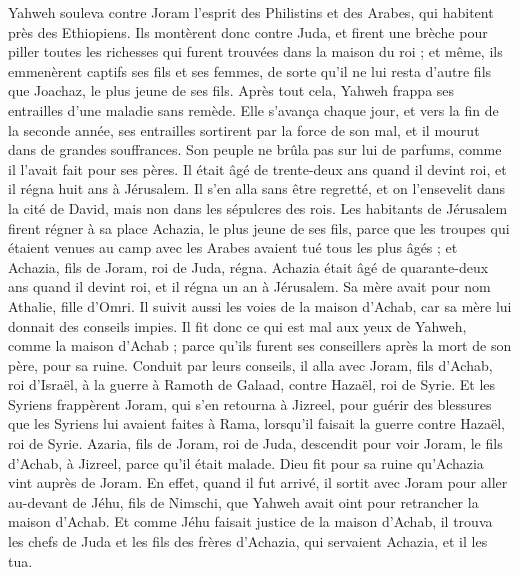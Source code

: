 \begin{multicols}{2}
Yahweh souleva contre Joram l'esprit des Philistins et des Arabes, qui habitent près des Ethiopiens.
Ils montèrent donc contre Juda, et firent une brèche pour piller toutes les richesses qui furent trouvées dans la maison du roi ; et même, ils emmenèrent captifs ses fils et ses femmes, de sorte qu'il ne lui resta d'autre fils que Joachaz, le plus jeune de ses fils.
Après tout cela, Yahweh frappa ses entrailles d'une maladie sans remède.
Elle s'avança chaque jour, et vers la fin de la seconde année, ses entrailles sortirent par la force de son mal, et il mourut dans de grandes souffrances. Son peuple ne brûla pas sur lui de parfums, comme il l'avait fait pour ses pères.
Il était âgé de trente-deux ans quand il devint roi, et il régna huit ans à Jérusalem. Il s'en alla sans être regretté, et on l'ensevelit dans la cité de David, mais non dans les sépulcres des rois.
\VerseOne{}Les habitants de Jérusalem firent régner à sa place Achazia, le plus jeune de ses fils, parce que les troupes qui étaient venues au camp avec les Arabes avaient tué tous les plus âgés ; et Achazia, fils de Joram, roi de Juda, régna.
Achazia était âgé de quarante-deux ans quand il devint roi, et il régna un an à Jérusalem. Sa mère avait pour nom Athalie, fille d'Omri.
Il suivit aussi les voies de la maison d'Achab, car sa mère lui donnait des conseils impies.
Il fit donc ce qui est mal aux yeux de Yahweh, comme la maison d'Achab ; parce qu'ils furent ses conseillers après la mort de son père, pour sa ruine.
Conduit par leurs conseils, il alla avec Joram, fils d'Achab, roi d'Israël, à la guerre à Ramoth de Galaad, contre Hazaël, roi de Syrie. Et les Syriens frappèrent Joram,
qui s'en retourna à Jizreel, pour guérir des blessures que les Syriens lui avaient faites à Rama, lorsqu'il faisait la guerre contre Hazaël, roi de Syrie. Azaria, fils de Joram, roi de Juda, descendit pour voir Joram, le fils d'Achab, à Jizreel, parce qu'il était malade.
Dieu fit pour sa ruine qu'Achazia vint auprès de Joram. En effet, quand il fut arrivé, il sortit avec Joram pour aller au-devant de Jéhu, fils de Nimschi, que Yahweh avait oint pour retrancher la maison d'Achab.
Et comme Jéhu faisait justice de la maison d'Achab, il trouva les chefs de Juda et les fils des frères d'Achazia, qui servaient Achazia, et il les tua.

\end{multicols}
